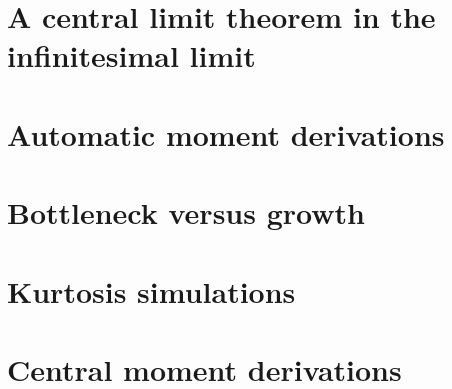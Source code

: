 \documentclass{article}
\newcommand{\beginsupplement}{%
        \setcounter{table}{0}
        \renewcommand{\thetable}{S\arabic{table}}%
        \setcounter{figure}{0}
        \renewcommand{\thefigure}{S\arabic{figure}}%
     }
\begin{document}
\appendix
\beginsupplement

\section{A central limit theorem in the infinitesimal limit}
\label{clt}

\section{Automatic moment derivations}
\label{symmath}

\section{Bottleneck versus growth}
\label{bnvsgrowth}

\section{Kurtosis simulations}
\label{kurtsim}

\section{Central moment derivations}
\label{moments}

\end{document}
